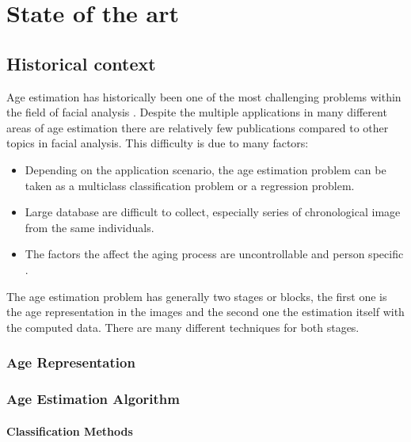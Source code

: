 \chapter{State of the art} \label{chap:sota}

\section{Historical context}

Age estimation has historically been one of the most challenging problems within the field of facial analysis \cite{5406526}\cite{han:age}. Despite the multiple applications in many different areas of age estimation there are relatively few publications compared to other topics in facial analysis. This difficulty is due to many factors: 
\begin{itemize}
	\item Depending on the application scenario, the age estimation problem can be taken as a multiclass classification problem or a regression problem.
	\item Large database are difficult to collect, especially series of chronological image from the same individuals.
	\item The factors the affect the aging process are uncontrollable and person specific \cite{4284917}\cite{4359348}\cite{1709980}.
\end{itemize}


The age estimation problem has generally two stages or blocks, the first one is the age representation in the images and the second one the estimation itself with the computed data. There are many different techniques for both stages. \cite{5406526}

\subsection{Age Representation}

\subsection{Age Estimation Algorithm}
\subsubsection{Classification Methods}
